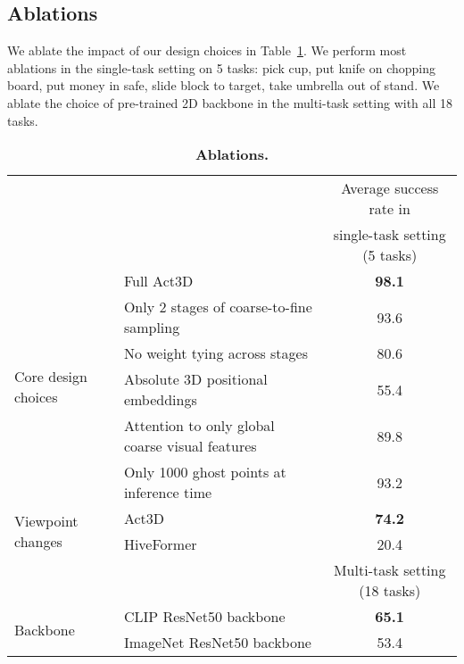 \subsection{Ablations}
\label{sec:ablations}


We ablate the impact of our design choices in Table~\ref{table:ablations}. We perform most ablations in the single-task setting on 5 tasks: pick cup, put knife on chopping board, put money in safe, slide block to target, take umbrella out of stand. We ablate the choice of pre-trained 2D backbone in the multi-task setting with all 18 tasks.




\begin{table}[]
\caption{\textbf{Ablations.}}
\label{table:ablations}
\small
\centering
\begin{tabular}{llc}
\toprule
\multicolumn{1}{c}{}                        & \multicolumn{1}{c}{}                               & Average success rate in       \\
\multicolumn{1}{c}{}                        & \multicolumn{1}{l}{}                          & single-task setting (5 tasks) \\ \midrule
\multirow{6}{*}{Core design choices}        & Full Act3D   & \textbf{98.1}          \\
                                            & Only 2 stages of coarse-to-fine sampling          & 93.6         \\
& No weight tying across stages                      & 80.6                          \\
                                            & Absolute 3D positional embeddings                  & 55.4                          \\
                                            & Attention to only global coarse visual features    & 89.8              \\
                                            & Only 1000 ghost points at inference time           & 93.2                          \\ \midrule
\multirow{2}{*}{Viewpoint changes}          & Act3D  & \textbf{74.2}      \\
                                            & HiveFormer                                         & 20.4                          \\ \midrule


&     & Multi-task setting (18 tasks) \\ \midrule
\multirow{3}{*}{Backbone}                   & CLIP ResNet50 backbone                             & \textbf{65.1}                 \\
                                            & ImageNet ResNet50 backbone                         & 53.4                          \\


\end{tabular}
\end{table}



